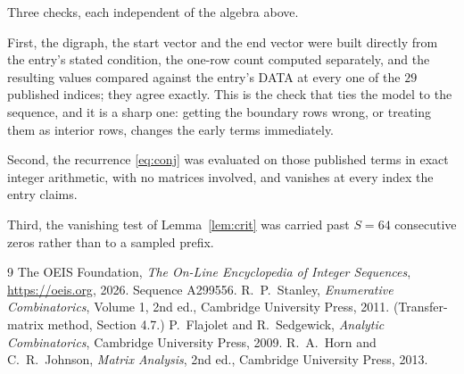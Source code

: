 \documentclass[11pt,a4paper]{article}
\theoremstyle{plain}
\theoremstyle{definition}
\begin{document}
Three checks, each independent of the algebra above.

First, the digraph, the start vector and the end vector were built directly from the
entry's stated condition, the one-row count computed separately, and the resulting values
compared against the entry's DATA at every one of the $29$ published indices; they
agree exactly. This is the check that ties the model to the sequence, and it is a sharp one:
getting the boundary rows wrong, or treating them as interior rows, changes the early terms
immediately.

Second, the recurrence \eqref{eq:conj} was evaluated on those published terms in exact
integer arithmetic, with no matrices involved, and vanishes at every index the entry claims.

Third, the vanishing test of Lemma~\ref{lem:crit} was carried past $S=64$ consecutive
zeros rather than to a sampled prefix.

\begin{thebibliography}{9}
 The OEIS Foundation, \emph{The On-Line Encyclopedia of Integer
Sequences}, \url{https://oeis.org}, 2026. Sequence A299556.
 R.~P.~Stanley, \emph{Enumerative Combinatorics}, Volume 1, 2nd ed.,
Cambridge University Press, 2011. (Transfer-matrix method, Section 4.7.)
 P.~Flajolet and R.~Sedgewick, \emph{Analytic Combinatorics}, Cambridge
University Press, 2009.
 R.~A.~Horn and C.~R.~Johnson, \emph{Matrix Analysis}, 2nd ed., Cambridge
University Press, 2013.
\end{thebibliography}
\end{document}
